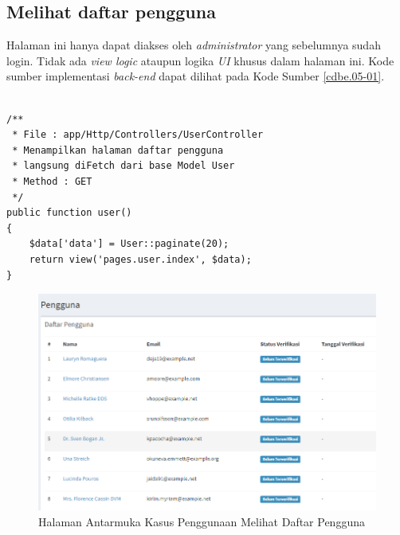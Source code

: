 \subsection{Melihat daftar pengguna}
Halaman ini hanya dapat diakses oleh \textit{administrator} yang sebelumnya sudah login. Tidak ada \textit{view logic} ataupun logika \textit{UI} khusus dalam halaman ini. Kode sumber implementasi \textit{back-end} dapat dilihat pada Kode Sumber \ref{cdbe.05-01}.

\begin{lstlisting}[label=cdbe.05-01,style=php,caption=Kode Sumber Antarmuka Registrasi]

/** 
 * File : app/Http/Controllers/UserController
 * Menampilkan halaman daftar pengguna
 * langsung diFetch dari base Model User
 * Method : GET
 */
public function user()
{
    $data['data'] = User::paginate(20);
    return view('pages.user.index', $data);
}
\end{lstlisting}
      
  \begin{figure}[H]
    \centering
    \includegraphics[width=\textwidth]{images/bab4/ui/05-01.png}
    \caption{Halaman Antarmuka Kasus Penggunaan Melihat Daftar Pengguna}
    \label{ui.05-01}
  \end{figure}
      
